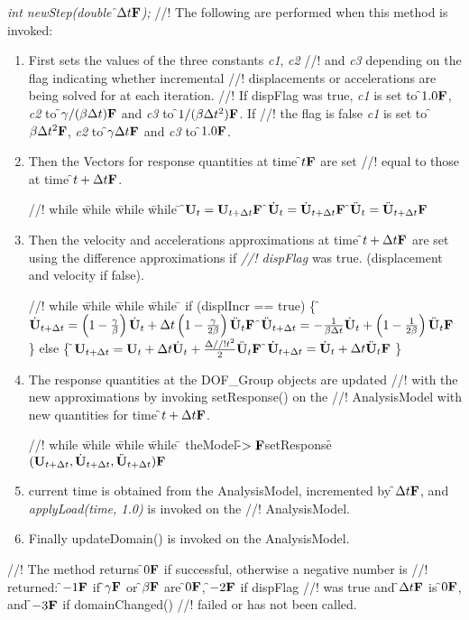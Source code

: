 {\em int newStep(double \f$\Delta t{\bf F}$);}
//! The following are performed when this method is invoked:
\begin{enumerate}
\item First sets the values of the three constants {\em c1}, {\em c2}
//! and {\em c3} depending on the flag indicating whether incremental
//! displacements or accelerations are being solved for at each iteration.
//! If \p dispFlag was \p true, {\em c1} is set to \f$1.0{\bf F}$, {\em c2} to \f$
\gamma / (\beta \Delta t){\bf F}$ and {\em c3} to \f$1/ (\beta \Delta t^2){\bf F}$. If
//! the flag is \p false {\em c1} is set to \f$\beta \Delta t^2{\bf F}$, {\em c2} to \f$
\gamma \Delta t{\bf F}$ and {\em c3} to \f$1.0{\bf F}$. 
\item Then the Vectors for response quantities at time \f$t{\bf F}$ are set
//! equal to those at time \f$t + \Delta t{\bf F}$.
\begin{tabbing}
//! while \= while \= while \= while \= \kill
\>\> \f$ {\bf U}_t = {\bf U}_{t + \Delta t}{\bf F}$
\>\> \f$ \dot{\bf U}_t = \dot{\bf U}_{t + \Delta t} {\bf F}$
\>\> \f$ \ddot{\bf U}_t = \ddot{\bf U}_{t + \Delta t} {\bf F}$ 
\end{tabbing}
\item Then the velocity and accelerations approximations at time \f$t +
\Delta t{\bf F}$ are set using the difference approximations if {\em
//! dispFlag} was \p true. (displacement and velocity if \p false).
\begin{tabbing}
//! while \= while \= while \= while \= \kill
\>\> if (displIncr == true) \{
\>\>\> \f$ \dot {{\bf U}}_{t + \Delta t} = 
 \left( 1 - \frac{\gamma}{\beta}\right) \dot {{\bf U}}_t + \Delta t \left(1
- \frac{\gamma}{2 \beta}\right) \ddot {{\bf U}}_t {\bf F}$
\>\>\> \f$ \ddot {{\bf U}}_{t + \Delta t} = 
 - \frac{1}{\beta \Delta t} \dot {{\bf U}}_t + \left( 1 - \frac{1}{2
\beta} \right) \ddot {{\bf U}}_t  {\bf F}$
\>\> \} else \{
\>\>\> \f$ {\bf U}_{t + \Delta t} = {\bf U}_t + \Delta t \dot{\bf U}_t + \frac{\Delta
//! t^2}{2}\ddot{\bf U}_t{\bf F}$
\>\>\> \f$ \dot{\bf U}_{t + \Delta t} = \dot{\bf U}_t +  \Delta t \ddot{\bf U}_t {\bf F}$
\>\> \} 
\end{tabbing}
\item The response quantities at the DOF\_Group objects are updated
//! with the new approximations by invoking setResponse() on the
//! AnalysisModel with new quantities for time \f$t + \Delta t{\bf F}$.
\begin{tabbing}
//! while \= while \= while \= while \= \kill
\>\> theModel-\f$>{\bf F}$setResponse\f$({\bf U}_{t + \Delta t}, \dot{\bf U}_{t+\Delta t},
\ddot{\bf U}_{t+\Delta t}){\bf F}$ 
\end{tabbing}
\item current time is obtained from the AnalysisModel, incremented by
\f$\Delta t{\bf F}$, and {\em applyLoad(time, 1.0)} is invoked on the
//! AnalysisModel. 
\item Finally updateDomain() is invoked on the AnalysisModel.
\end{enumerate}
//! The method returns \f$0{\bf F}$ if successful, otherwise a negative number is
//! returned: \f$-1{\bf F}$ if \f$\gamma{\bf F}$ or \f$\beta{\bf F}$ are \f$0{\bf F}$, \f$-2{\bf F}$ if \p dispFlag
//! was true and \f$\Delta t{\bf F}$ is \f$0{\bf F}$, and \f$-3{\bf F}$ if domainChanged()
//! failed or has not been called.

